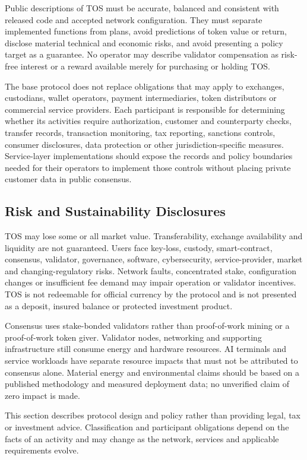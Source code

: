 \documentclass[11pt,oneside]{article}
\begin{document}
Public descriptions of TOS must be accurate, balanced and consistent with released code and
accepted network configuration. They must separate implemented functions from plans, avoid
predictions of token value or return, disclose material technical and economic risks, and
avoid presenting a policy target as a guarantee. No operator may describe validator
compensation as risk-free interest or a reward available merely for purchasing or holding
TOS.

The base protocol does not replace obligations that may apply to exchanges, custodians,
wallet operators, payment intermediaries, token distributors or commercial service
providers. Each participant is responsible for determining whether its activities require
authorization, customer and counterparty checks, transfer records, transaction monitoring,
tax reporting, sanctions controls, consumer disclosures, data protection or other
jurisdiction-specific measures. Service-layer implementations should expose the records and
policy boundaries needed for their operators to implement those controls without placing
private customer data in public consensus.

\subsection{Risk and Sustainability Disclosures}

TOS may lose some or all market value. Transferability, exchange availability and liquidity
are not guaranteed. Users face key-loss, custody, smart-contract, consensus, validator,
governance, software, cybersecurity, service-provider, market and changing-regulatory risks.
Network faults, concentrated stake, configuration changes or insufficient fee demand may
impair operation or validator incentives. TOS is not redeemable for official currency by the
protocol and is not presented as a deposit, insured balance or protected investment product.

Consensus uses stake-bonded validators rather than proof-of-work mining or a proof-of-work
token giver. Validator nodes, networking and supporting infrastructure still consume energy
and hardware resources. AI terminals and service workloads have separate resource impacts
that must not be attributed to consensus alone. Material energy and environmental claims
should be based on a published methodology and measured deployment data; no unverified claim
of zero impact is made.

This section describes protocol design and policy rather than providing legal, tax or
investment advice. Classification and participant obligations depend on the facts of an
activity and may change as the network, services and applicable requirements evolve.
\end{document}

